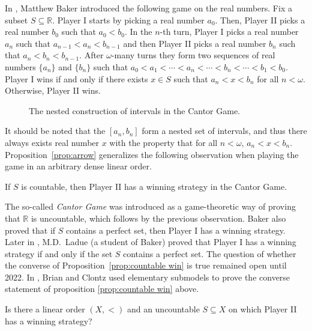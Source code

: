 In \cite{baker}, Matthew Baker introduced the following game on the real numbers.
Fix a subset $S\subseteq\mathbb{R}$.
Player I starts by picking a real number $a_0$.
Then, Player II picks a real number $b_0$ such that $a_0<b_0$.
In the $n$-th turn, Player I picks a real number $a_n$ such that $a_{n-1}<a_n<b_{n-1}$ and then Player II picks a real number $b_n$ such that $a_n<b_n<b_{n-1}$.
After $\omega$-many turns they form two sequences of real numbers $\{a_n\}$ and $\{b_n\}$ such that $a_0<a_1<\cdots<a_n<\cdots<b_n<\cdots<b_1<b_0$.
Player I wins if and only if there exists $x\in S$ such that $a_n<x<b_n$ for all $n<\omega$.
Otherwise, Player II wins.

\begin{figure}[htbp]
    \centering
    
    \caption{The nested construction of intervals in the Cantor Game.}
    \label{fig:cantor_game}
\end{figure}

It should be noted that the $[a_n,b_n]$ form a nested set of intervals, and thus there always exists real number $x$ with the property that for all $n<\omega$, $a_n<x<b_n$.
Proposition~\ref{prop:arrow} generalizes the following observation when playing the game in an arbitrary dense linear order.
  
\begin{proposition}\label{prop:countable win}
    If $S$ is countable, then Player II has a winning strategy in the Cantor Game.
\end{proposition}

The so-called \emph{Cantor Game} was introduced as a game-theoretic way of proving that $\mathbb{R}$ is uncountable, which follows by the previous observation.
Baker also proved that if $S$ contains a perfect set, then Player I has a winning strategy.
Later in \cite{cantor}, M.D.\ Ladue (a student of Baker) proved that Player I has a winning strategy if and only if the set $S$ contains a perfect set.
The question of whether the converse of Proposition~\ref{prop:countable win} is true remained open until 2022.
In \cite{brian-clontz}, Brian and Clontz used elementary submodels to prove the converse statement of proposition \ref{prop:countable win} above.

\begin{question}\label{question:brian-clontz}
    Is there a linear order $(X,<)$ and an uncountable $S\subseteq X$ on which Player II has a winning strategy?
\end{question}

